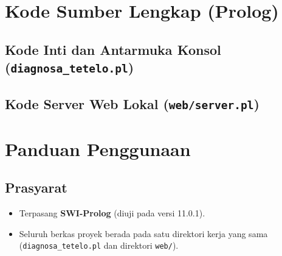 \documentclass[12pt,a4paper]{report}
\begin{document}
\appendix

\chapter{Kode Sumber Lengkap (Prolog)}

\section{Kode Inti dan Antarmuka Konsol (\texttt{diagnosa\_tetelo.pl})}


\section{Kode Server Web Lokal (\texttt{web/server.pl})}


\chapter{Panduan Penggunaan}

\section{Prasyarat}
\begin{itemize}
  \item Terpasang \textbf{SWI-Prolog} (diuji pada versi 11.0.1).
  \item Seluruh berkas proyek berada pada satu direktori kerja yang sama (\texttt{diagnosa\_tetelo.pl} dan direktori \texttt{web/}).
\end{itemize}
\end{document}
